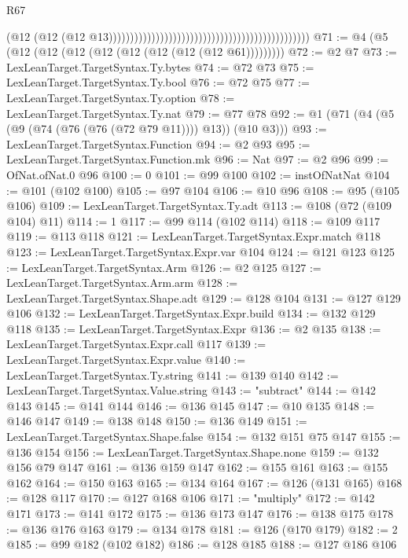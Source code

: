 \begin{lexlean}{R67}
\begin{coremodule}
                                                                                            (@12
                                                                                              (@12
                                                                                                (@12
                                                                                                  @13)))))))))))))))))))))))))))))))))))))))))))))))
@71 := @4 (@5 (@12 (@12 (@12 (@12 (@12 (@12 (@12 (@12 @61)))))))))
@72 := @2 @7
@73 := LexLeanTarget.TargetSyntax.Ty.bytes
@74 := @72 @73
@75 := LexLeanTarget.TargetSyntax.Ty.bool
@76 := @72 @75
@77 := LexLeanTarget.TargetSyntax.Ty.option
@78 := LexLeanTarget.TargetSyntax.Ty.nat
@79 := @77 @78
@92 := @1 (@71 (@4 (@5 (@9 (@74 (@76 (@76 (@72 @79 @11)))) @13)) (@10 @3)))
@93 := LexLeanTarget.TargetSyntax.Function
@94 := @2 @93
@95 := LexLeanTarget.TargetSyntax.Function.mk
@96 := Nat
@97 := @2 @96
@99 := OfNat.ofNat.{0} @96
@100 := 0
@101 := @99 @100
@102 := instOfNatNat
@104 := @101 (@102 @100)
@105 := @97 @104
@106 := @10 @96
@108 := @95 (@105 @106)
@109 := LexLeanTarget.TargetSyntax.Ty.adt
@113 := @108 (@72 (@109 @104) @11)
@114 := 1
@117 := @99 @114 (@102 @114)
@118 := @109 @117
@119 := @113 @118
@121 := LexLeanTarget.TargetSyntax.Expr.match @118
@123 := LexLeanTarget.TargetSyntax.Expr.var @104
@124 := @121 @123
@125 := LexLeanTarget.TargetSyntax.Arm
@126 := @2 @125
@127 := LexLeanTarget.TargetSyntax.Arm.arm
@128 := LexLeanTarget.TargetSyntax.Shape.adt
@129 := @128 @104
@131 := @127 @129 @106
@132 := LexLeanTarget.TargetSyntax.Expr.build
@134 := @132 @129 @118
@135 := LexLeanTarget.TargetSyntax.Expr
@136 := @2 @135
@138 := LexLeanTarget.TargetSyntax.Expr.call @117
@139 := LexLeanTarget.TargetSyntax.Expr.value
@140 := LexLeanTarget.TargetSyntax.Ty.string
@141 := @139 @140
@142 := LexLeanTarget.TargetSyntax.Value.string
@143 := "subtract"
@144 := @142 @143
@145 := @141 @144
@146 := @136 @145
@147 := @10 @135
@148 := @146 @147
@149 := @138 @148
@150 := @136 @149
@151 := LexLeanTarget.TargetSyntax.Shape.false
@154 := @132 @151 @75 @147
@155 := @136 @154
@156 := LexLeanTarget.TargetSyntax.Shape.none
@159 := @132 @156 @79 @147
@161 := @136 @159 @147
@162 := @155 @161
@163 := @155 @162
@164 := @150 @163
@165 := @134 @164
@167 := @126 (@131 @165)
@168 := @128 @117
@170 := @127 @168 @106
@171 := "multiply"
@172 := @142 @171
@173 := @141 @172
@175 := @136 @173 @147
@176 := @138 @175
@178 := @136 @176 @163
@179 := @134 @178
@181 := @126 (@170 @179)
@182 := 2
@185 := @99 @182 (@102 @182)
@186 := @128 @185
@188 := @127 @186 @106

\end{coremodule}
\end{lexlean}
